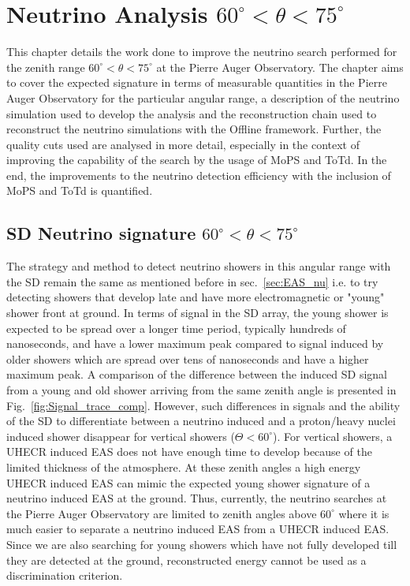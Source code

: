 
\chapter{Neutrino Analysis \texorpdfstring{$60^\circ < \theta < 75^\circ$}{}}
\label{chap:DGL}
This chapter details the work done to improve the neutrino search performed for the zenith range $60^\circ < \theta < 75^\circ$ at the Pierre Auger Observatory. The chapter aims to cover the expected signature in terms of measurable quantities in the Pierre Auger Observatory for the particular angular range, a description of the neutrino simulation used to develop the analysis and the reconstruction chain used to reconstruct the neutrino simulations with the Offline framework. Further, the quality cuts used are analysed in more detail, especially in the context of improving the capability of the search by the usage of MoPS and ToTd. In the end, the improvements to the neutrino detection efficiency with the inclusion of MoPS and ToTd is quantified.


\section{SD Neutrino signature \texorpdfstring{$60^{\circ} < \theta < 75^{\circ}$}{}}
\label{sec:sig_DGL}

The strategy and method to detect neutrino showers in this angular range with the SD remain the same as mentioned before in sec.~\ref{sec:EAS_nu} i.e. to try detecting showers that develop late and have more electromagnetic or "young" shower front at ground. In terms of signal in the SD array, the young shower is expected to be spread over a longer time period, typically hundreds of nanoseconds, and have a lower maximum peak compared to signal induced by older showers which are spread over tens of nanoseconds and have a higher maximum peak. A comparison of the difference between the induced SD signal from a young and old shower arriving from the same zenith angle is presented in Fig.~\ref{fig:Signal_trace_comp}. However, such differences in signals and the ability of the SD to differentiate between a neutrino induced and a proton/heavy nuclei induced shower disappear for vertical showers ($\Theta < 60^{\circ}$). For vertical showers, a UHECR induced EAS does not have enough time to develop because of the limited thickness of the atmosphere. At these zenith angles a high energy UHECR induced EAS can mimic the expected young shower signature of a neutrino induced EAS at the ground. Thus, currently, the neutrino searches at the Pierre Auger Observatory are limited to zenith angles above $60^\circ$ where it is much easier to separate a neutrino induced EAS from a UHECR induced EAS. Since we are also searching for young showers which have not fully developed till they are detected at the ground, reconstructed energy cannot be used as a discrimination criterion.

